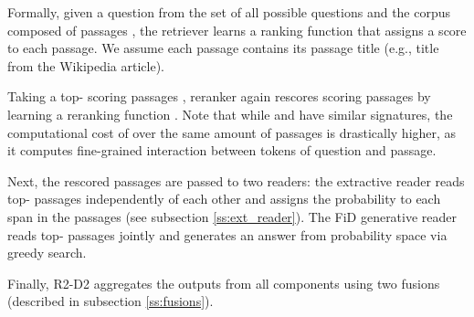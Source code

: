 \documentclass[11pt]{article}
\begin{document}
Formally, given a question  from the set of all possible questions   and the corpus  composed of passages , the retriever learns a ranking function  that assigns a score to each passage. We assume each passage contains its passage title (e.g., title from the Wikipedia article).

Taking a top- scoring passages , reranker again rescores   scoring passages by learning a reranking function . Note that while  and  have similar signatures, the computational cost of  over the same amount of passages is drastically higher, as it computes fine-grained interaction between tokens of question and passage.


Next, the rescored passages are passed to two readers: the extractive reader reads top- passages  independently of each other and assigns the probability  to each span  in the passages (see subsection \ref{ss:ext_reader}). 
The FiD generative reader reads top- passages   jointly and generates an answer from probability space  via greedy search.

Finally, R2-D2 aggregates the outputs from all components using two fusions (described in subsection \ref{ss:fusions}).
\end{document}
